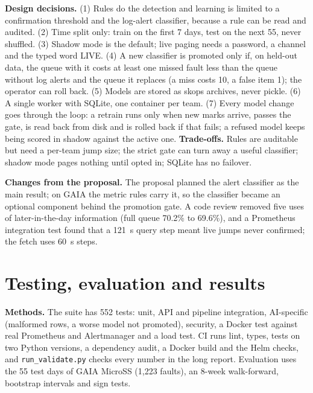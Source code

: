 \documentclass[12pt,a4paper]{article}
\begin{document}
\textbf{Design decisions.} (1) Rules do the detection and learning is limited to a confirmation threshold and the log-alert classifier, because a rule can be read and audited. (2) Time split only: train on the first 7 days, test on the next 55, never shuffled. (3) Shadow mode is the default; live paging needs a password, a channel and the typed word LIVE. (4) A new classifier is promoted only if, on held-out data, the queue with it costs at least one missed fault less than the queue without log alerts and the queue it replaces (a miss costs 10, a false item 1); the operator can roll back. (5) Models are stored as skops archives, never pickle. (6) A single worker with SQLite, one container per team. (7) Every model change goes through the loop: a retrain runs only when new marks arrive, passes the gate, is read back from disk and is rolled back if that fails; a refused model keeps being scored in shadow against the active one. \textbf{Trade-offs.} Rules are auditable but need a per-team jump size; the strict gate can turn away a useful classifier; shadow mode pages nothing until opted in; SQLite has no failover.

\textbf{Changes from the proposal.} The proposal planned the alert classifier as the main result; on GAIA the metric rules carry it, so the classifier became an optional component behind the promotion gate. A code review removed five uses of later-in-the-day information (full queue 70.2\% to 69.6\%), and a Prometheus integration test found that a 121~s query step meant live jumps never confirmed; the fetch uses 60~s steps.

\section{Testing, evaluation and results}
\textbf{Methods.} The suite has 552 tests: unit, API and pipeline integration, AI-specific (malformed rows, a worse model not promoted), security, a Docker test against real Prometheus and Alertmanager and a load test. CI runs lint, types, tests on two Python versions, a dependency audit, a Docker build and the Helm checks, and \texttt{run\_validate.py} checks every number in the long report. Evaluation uses the 55 test days of GAIA MicroSS (1{,}223 faults), an 8-week walk-forward, bootstrap intervals and sign tests.
\end{document}
